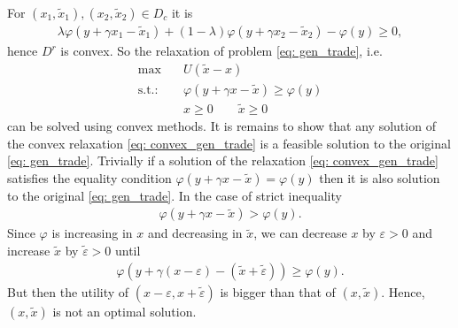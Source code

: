 For $(x_1, \tilde{x}_1), (x_2, \tilde{x}_2) \in D_{c}$ it is
\begin{align}
    \lambda \varphi(y + \gamma x_1 - \tilde{x}_1)
    + (1-\lambda)\varphi(y+\gamma x_2 - \tilde{x}_2) - \varphi(y)\ge 0,
\end{align}
hence $D^{r}$ is convex. So the relaxation of problem \ref{eq: gen_trade},
i.e.
\begin{align}
    \text{max} \quad &U(\tilde{x} - x) \label{eq: convex_gen_trade}\\
    \text{s.t.:}\quad & \varphi(y + \gamma x - \tilde{x}) \ge
    \varphi(y)\nonumber \\
      &x\ge 0 \qquad \tilde{x} \ge 0\nonumber
\end{align}
can be solved using convex methods. It is remains to show that any solution
of the convex relaxation \ref{eq: convex_gen_trade} is a feasible solution to
the original \ref{eq: gen_trade}. Trivially if a solution of the relaxation
\ref{eq: convex_gen_trade} satisfies the equality condition $\varphi(y +
\gamma x - \tilde{x}) = \varphi(y)$ then it is also solution to the original
\ref{eq: gen_trade}. In the case of strict inequality
\begin{align}
    \varphi(y + \gamma x - \tilde{x}) > \varphi(y).
\end{align}
Since $\varphi$ is increasing in $x$ and decreasing in $\tilde{x}$, we
can decrease $x$ by $\varepsilon>0$ and increase $\tilde{x}$ by
$\tilde{\varepsilon}>0$ until
\begin{align}
    \varphi(y + \gamma (x-\varepsilon) - (\tilde{x}+\tilde{\varepsilon})) \ge \varphi(y).
\end{align}
But then the utility of $(x-\varepsilon, x+\tilde{\varepsilon})$ is bigger
than that of $(x,\tilde{x})$. Hence, $(x,\tilde{x})$ is not an optimal
solution.

